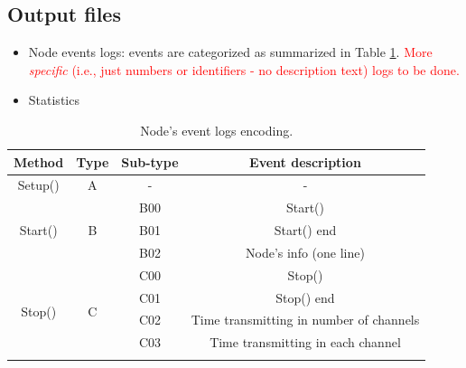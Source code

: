 \documentclass[a4paper]{article}
\begin{document}
\subsection{Output files}
\begin{itemize}
	\item Node events logs: events are categorized as summarized in Table \ref{table:event_coding}. \textcolor{red}{More \textit{specific} (i.e., just numbers or identifiers - no description text) logs to be done.}
	\item Statistics
\end{itemize}

\begin{table}[]
\centering
\scriptsize
\caption{Node's event logs encoding.}
\label{table:event_coding}
\begin{tabular}{|c|c|c|c|}
\hline
\textbf{Method}                            & \textbf{Type}       & \textbf{Sub-type} & \textbf{Event description}                              \\ \hline
Setup()                                    & A                   & -                 & -                                                       \\ \hline
\multirow{3}{*}{Start()}                   & \multirow{3}{*}{B}  & B00               & Start()                                                 \\ \cline{3-4} 
                                           &                     & B01               & Start() end                                             \\ \cline{3-4} 
                                           &                     & B02               & Node's info (one line)                                  \\ \hline
\multirow{6}{*}{Stop()}                    & \multirow{6}{*}{C}  & C00               & Stop()                                                  \\ \cline{3-4} 
                                           &                     & C01               & Stop() end                                              \\ \cline{3-4} 
                                           &                     & C02               & Time transmitting in number of channels                 \\ \cline{3-4} 
                                           &                     & C03               & Time transmitting in each channel                       \\ \cline{3-4} 

\end{tabular}
\end{table}
\end{document}
